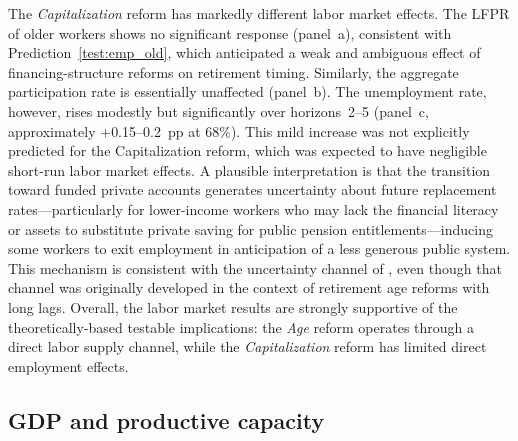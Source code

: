 \documentclass[11pt,english,a4paper, twoside, authoryear]{article}
\begin{document}
The \textit{Capitalization} reform has markedly different labor market effects. The LFPR of older workers shows no significant response (panel~a), consistent with Prediction~\ref{test:emp_old}, which anticipated a weak and ambiguous effect of financing-structure reforms on retirement timing. Similarly, the aggregate participation rate is essentially unaffected (panel~b). The unemployment rate, however, rises modestly but significantly over horizons~2--5 (panel~c, approximately $+$0.15--0.2~pp at 68\%). This mild increase was not explicitly predicted for the Capitalization reform, which was expected to have negligible short-run labor market effects. A plausible interpretation is that the transition toward funded private accounts generates uncertainty about future replacement rates---particularly for lower-income workers who may lack the financial literacy or assets to substitute private saving for public pension entitlements---inducing some workers to exit employment in anticipation of a less generous public system. This mechanism is consistent with the uncertainty channel of \citet{BiZubairy2023}, even though that channel was originally developed in the context of retirement age reforms with long lags. Overall, the labor market results are strongly supportive of the theoretically-based testable implications: the \textit{Age} reform operates through a direct labor supply channel, while the \textit{Capitalization} reform has limited direct employment effects.

\FloatBarrier
\subsection{GDP and productive capacity}
\label{sec:gdp}
\label{sec:gdp}
\end{document}
